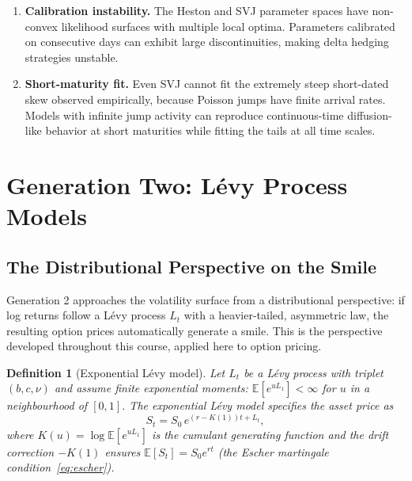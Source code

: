 \documentclass[12pt, a4paper]{article}
\newtheorem{definition}{Definition}
\begin{document}
\begin{enumerate}[label=(\roman*)]
  \item \textbf{Calibration instability.} The Heston and SVJ parameter
        spaces have non-convex likelihood surfaces with multiple local
        optima. Parameters calibrated on consecutive days can exhibit
        large discontinuities, making delta hedging strategies
        unstable.
  \item \textbf{Short-maturity fit.} Even SVJ cannot fit the extremely
        steep short-dated skew observed empirically, because Poisson
        jumps have finite arrival rates. Models with infinite jump
        activity can reproduce continuous-time diffusion-like behavior at short maturities while fitting the tails at all time scales.
\end{enumerate}

\section{Generation Two: L\'{e}vy Process Models}

\subsection{The Distributional Perspective on the Smile}

Generation 2 approaches the volatility surface from a distributional
perspective: if log returns follow a L\'{e}vy process $L_t$ with a
heavier-tailed, asymmetric law, the resulting option prices
automatically generate a smile. This is the perspective developed
throughout this course, applied here to option pricing.\\

\begin{definition}[Exponential L\'{e}vy model]
  Let $L_t$ be a L\'{e}vy process with triplet $(b, c, \nu)$ and
  assume finite exponential moments: $\mathbb{E}[e^{uL_1}] < \infty$
  for $u$ in a neighbourhood of $[0,1]$. The \emph{exponential
  L\'{e}vy model} specifies the asset price as
  \begin{equation}
    S_t = S_0\,e^{(r-K(1))t + L_t},
    \label{eq:expLevy}
  \end{equation}
  where $K(u) = \log\mathbb{E}[e^{uL_1}]$ is the cumulant generating
  function and the drift correction $-K(1)$ ensures
  $\mathbb{E}[S_t] = S_0 e^{rt}$ (the Escher martingale
  condition~\eqref{eq:escher}).
\end{definition}
\end{document}
